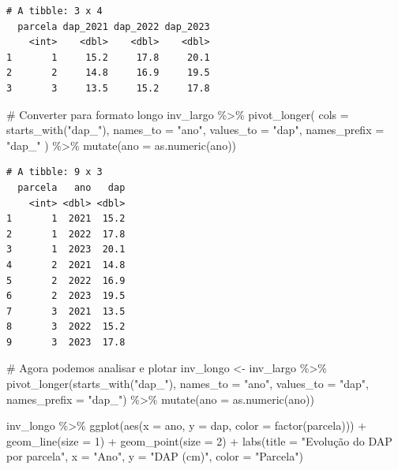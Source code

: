 \documentclass[
  letterpaper,
]{scrbook}
\newenvironment{Shaded}{\begin{snugshade}}{\end{snugshade}}
\newcommand{\AttributeTok}[1]{\textcolor[rgb]{0.40,0.45,0.13}{#1}}
\newcommand{\CommentTok}[1]{\textcolor[rgb]{0.37,0.37,0.37}{#1}}
\newcommand{\DecValTok}[1]{\textcolor[rgb]{0.68,0.00,0.00}{#1}}
\newcommand{\FunctionTok}[1]{\textcolor[rgb]{0.28,0.35,0.67}{#1}}
\newcommand{\NormalTok}[1]{\textcolor[rgb]{0.00,0.23,0.31}{#1}}
\newcommand{\OtherTok}[1]{\textcolor[rgb]{0.00,0.23,0.31}{#1}}
\newcommand{\SpecialCharTok}[1]{\textcolor[rgb]{0.37,0.37,0.37}{#1}}
\newcommand{\StringTok}[1]{\textcolor[rgb]{0.13,0.47,0.30}{#1}}
\begin{document}
\begin{verbatim}
# A tibble: 3 x 4
  parcela dap_2021 dap_2022 dap_2023
    <int>    <dbl>    <dbl>    <dbl>
1       1     15.2     17.8     20.1
2       2     14.8     16.9     19.5
3       3     13.5     15.2     17.8
\end{verbatim}

\begin{Shaded}
\begin{Highlighting}[]
\CommentTok{\# Converter para formato longo}
\NormalTok{inv\_largo }\SpecialCharTok{\%\textgreater{}\%} 
  \FunctionTok{pivot\_longer}\NormalTok{(}
    \AttributeTok{cols =} \FunctionTok{starts\_with}\NormalTok{(}\StringTok{"dap\_"}\NormalTok{),}
    \AttributeTok{names\_to =} \StringTok{"ano"}\NormalTok{,}
    \AttributeTok{values\_to =} \StringTok{"dap"}\NormalTok{,}
    \AttributeTok{names\_prefix =} \StringTok{"dap\_"}
\NormalTok{  ) }\SpecialCharTok{\%\textgreater{}\%} 
  \FunctionTok{mutate}\NormalTok{(}\AttributeTok{ano =} \FunctionTok{as.numeric}\NormalTok{(ano))}
\end{Highlighting}
\end{Shaded}

\begin{verbatim}
# A tibble: 9 x 3
  parcela   ano   dap
    <int> <dbl> <dbl>
1       1  2021  15.2
2       1  2022  17.8
3       1  2023  20.1
4       2  2021  14.8
5       2  2022  16.9
6       2  2023  19.5
7       3  2021  13.5
8       3  2022  15.2
9       3  2023  17.8
\end{verbatim}

\begin{Shaded}
\begin{Highlighting}[]
\CommentTok{\# Agora podemos analisar e plotar}
\NormalTok{inv\_longo }\OtherTok{\textless{}{-}}\NormalTok{ inv\_largo }\SpecialCharTok{\%\textgreater{}\%} 
  \FunctionTok{pivot\_longer}\NormalTok{(}\FunctionTok{starts\_with}\NormalTok{(}\StringTok{"dap\_"}\NormalTok{), }\AttributeTok{names\_to =} \StringTok{"ano"}\NormalTok{, }\AttributeTok{values\_to =} \StringTok{"dap"}\NormalTok{, }\AttributeTok{names\_prefix =} \StringTok{"dap\_"}\NormalTok{) }\SpecialCharTok{\%\textgreater{}\%} 
  \FunctionTok{mutate}\NormalTok{(}\AttributeTok{ano =} \FunctionTok{as.numeric}\NormalTok{(ano))}

\NormalTok{inv\_longo }\SpecialCharTok{\%\textgreater{}\%} 
  \FunctionTok{ggplot}\NormalTok{(}\FunctionTok{aes}\NormalTok{(}\AttributeTok{x =}\NormalTok{ ano, }\AttributeTok{y =}\NormalTok{ dap, }\AttributeTok{color =} \FunctionTok{factor}\NormalTok{(parcela))) }\SpecialCharTok{+}
  \FunctionTok{geom\_line}\NormalTok{(}\AttributeTok{size =} \DecValTok{1}\NormalTok{) }\SpecialCharTok{+}
  \FunctionTok{geom\_point}\NormalTok{(}\AttributeTok{size =} \DecValTok{2}\NormalTok{) }\SpecialCharTok{+}
  \FunctionTok{labs}\NormalTok{(}\AttributeTok{title =} \StringTok{"Evolução do DAP por parcela"}\NormalTok{, }\AttributeTok{x =} \StringTok{"Ano"}\NormalTok{, }\AttributeTok{y =} \StringTok{"DAP (cm)"}\NormalTok{, }\AttributeTok{color =} \StringTok{"Parcela"}\NormalTok{)}
\end{Highlighting}
\end{Shaded}
\end{document}
